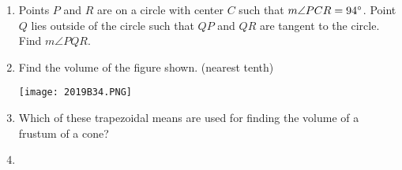 \documentclass[../uilmath.tex]{subfiles}
\begin{document}
\begin{enumerate}[label=\bfseries\arabic*.]
    \item %
    Points $P$ and $R$ are on a circle with center $C$ such that $m\angle PCR=94\degree$. Point $Q$ lies outside of the circle such that $QP$ and $QR$ are tangent to the circle. Find $m\angle PQR$.

    \item %
    Find the volume of the figure shown. (nearest tenth)
    \begin{center}
        \texttt{[image: 2019B34.PNG]}
    \end{center}

    \item %
    Which of these trapezoidal means are used for finding the volume of a frustum of a cone?

    \item %
    
\end{enumerate}
\end{document}
